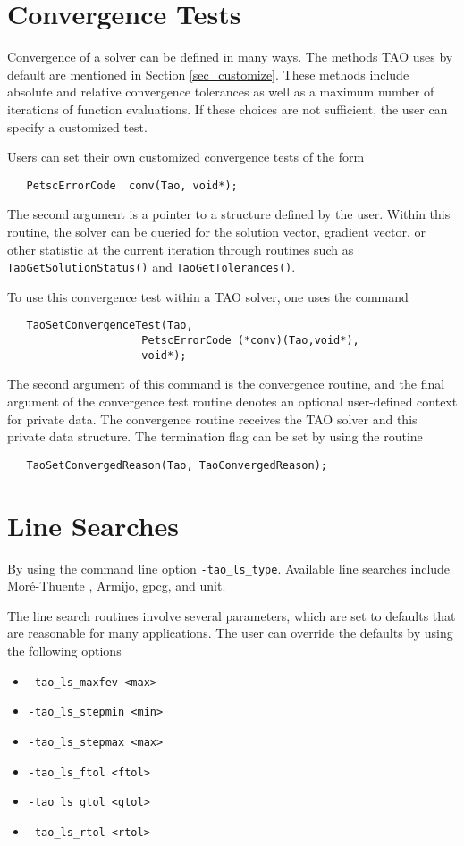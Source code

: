 \section{Convergence Tests}
\label{sec_Taoconvergence}

Convergence of a solver can be defined in many ways.
The methods TAO uses by default are mentioned in 
Section \ref{sec_customize}.
These methods include absolute and relative convergence tolerances as well
as a maximum number of iterations of function evaluations.
If these choices are not sufficient, 
the user can specify a customized test. 

Users can set their own customized convergence tests of the form
\begin{verbatim}
   PetscErrorCode  conv(Tao, void*);
\end{verbatim}
\noindent
The second argument is a pointer to a structure defined by the user.
Within this routine, the solver
can be queried for the solution vector, gradient vector,
or other statistic at the current iteration through routines such as
{\tt TaoGetSolutionStatus()} and  {\tt TaoGetTolerances()}.

To use this convergence test within a TAO solver, one uses
the command 
\begin{verbatim}
   TaoSetConvergenceTest(Tao,
                     PetscErrorCode (*conv)(Tao,void*),
                     void*);
\end{verbatim}
\noindent
The second argument of this command is the convergence routine, and the
final argument of the convergence test routine denotes an optional 
user-defined context for private data.  
The convergence routine receives the TAO solver and this private data
structure. 
The termination flag can be set by using the routine
\begin{verbatim}
   TaoSetConvergedReason(Tao, TaoConvergedReason);
\end{verbatim}
\noindent



\section{Line Searches} 
\label{sec_TaoLineSearch}

By using the command line option  {\tt -tao\_ls\_type}.  
Available line searches 
include Mor\'{e}-Thuente \cite{more:92}, Armijo, gpcg, and unit.

The line search routines involve several parameters, which are set
to defaults that are reasonable for many applications.  The user
can override the defaults by using the following options
\begin{itemize}
\item {\tt -tao\_ls\_maxfev <max>}
\item {\tt -tao\_ls\_stepmin <min>}
\item {\tt -tao\_ls\_stepmax <max>}
\item {\tt -tao\_ls\_ftol <ftol>}
\item {\tt -tao\_ls\_gtol <gtol>}
\item {\tt -tao\_ls\_rtol <rtol>}
\end{itemize}

